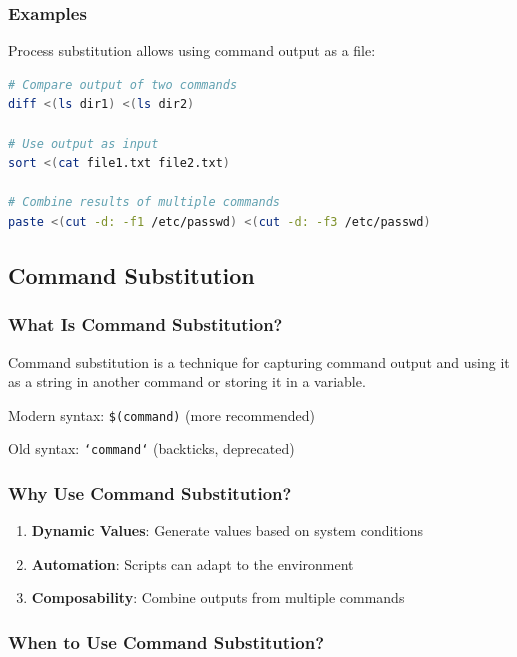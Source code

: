 \subsubsection{Examples}

Process substitution allows using command output as a file:

\begin{lstlisting}[language=bash, caption={Process substitution}]
# Compare output of two commands
diff <(ls dir1) <(ls dir2)

# Use output as input
sort <(cat file1.txt file2.txt)

# Combine results of multiple commands
paste <(cut -d: -f1 /etc/passwd) <(cut -d: -f3 /etc/passwd)
\end{lstlisting}

\subsection{Command Substitution}

\subsubsection{What Is Command Substitution?}

Command substitution is a technique for capturing command output and using it as a string in another command or storing it in a variable.

Modern syntax: \texttt{\$(command)} (more recommended)

Old syntax: \texttt{`command`} (backticks, deprecated)

\subsubsection{Why Use Command Substitution?}

\begin{enumerate}
	\item \textbf{Dynamic Values}: Generate values based on system conditions
	\item \textbf{Automation}: Scripts can adapt to the environment
	\item \textbf{Composability}: Combine outputs from multiple commands
\end{enumerate}

\subsubsection{When to Use Command Substitution?}

